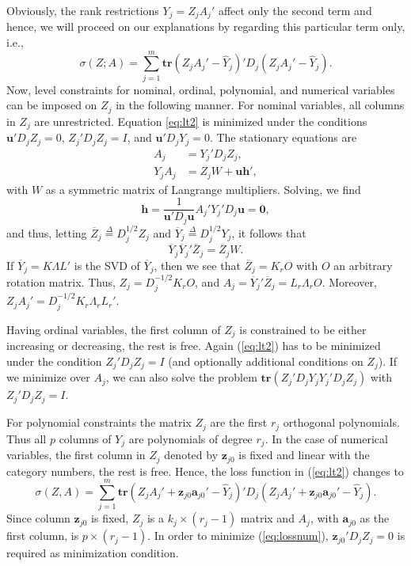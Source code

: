 \documentclass[article]{Z}
\newcommand{\defi}{\mathop{=}\limits^{\Delta}}
\begin{document}
Obviously, the rank restrictions $Y_j=Z_jA_j'$ affect only the second term and hence, we will proceed on our explanations by regarding this particular term only, i.e.,
\begin{equation}
\label{eq:lt2}
\sigma(Z;A)=\sum_{j=1}^m \mathbf{tr}(Z_jA_j'-\hat Y_j)'D_j(Z_jA_j'-\hat Y_j).
\end{equation}
Now, level constraints for nominal, ordinal, polynomial, and numerical variables can be imposed on $Z_j$ in the following manner. 
For nominal variables, all columns in $Z_j$ are unrestricted. Equation \ref{eq:lt2} is minimized under the conditions $\mathbf{u}'D_jZ_j=0$, $Z_j'D_jZ_j=I$, and $\mathbf{u}'D_jY_j=0$. The stationary equations are 
\begin{subequations}
\begin{align}
A_j&=Y_j'D_jZ_j,\\
Y_jA_j&=Z_jW+\mathbf{uh}',
\end{align}
\end{subequations}
with $W$ as a symmetric matrix of Langrange multipliers. Solving, we find
\begin{equation}
\mathbf{h}=\frac{1}{\mathbf{u}'D_j\mathbf{u}}A_j'Y_j'D_j\mathbf{u}=\mathbf{0},
\end{equation}
and thus, letting $\overline Z_j\defi D_j^{1/2}Z_j$ and $\overline Y_j\defi D_j^{1/2}Y_j$, it follows that
\begin{equation}
\overline Y_j\overline Y_j' \overline Z_j=\overline Z_jW.
\end{equation}
If $\overline Y_j=K\Lambda L'$ is the SVD of $\overline Y_j$, then
we see that $\overline Z_j=K_rO$ with $O$ an arbitrary rotation matrix. Thus, $Z_j=D_j^{-1/2}K_rO$, and
$A_j=\overline Y_j'\overline Z_j=L_r\Lambda_r O$. Moreover, $Z_jA_j'=D_j^{-1/2}K_r\Lambda_rL_r'$.

Having ordinal variables, the first column of $Z_j$ is constrained to be either increasing or decreasing, the rest is free. Again (\ref{eq:lt2}) has to be minimized under the condition $Z_j'D_j^{}Z_j^{}=I$ (and optionally additional conditions on $Z_j$). If we minimize over $A_j$, we can also solve the problem $\mathbf{tr}(Z_j'D_j^{}Y_j^{}Y_j'D_j^{}Z_j^{})$ with $Z_j'D_j^{}Z_j^{}=I$.

For polynomial constraints the matrix $Z_j$ are the first \(r_j\) orthogonal polynomials. Thus all \(p\) columns of \(Y_j\) are polynomials of degree \(r_j\).  In the case of numerical variables, the first column in $Z_j$ denoted by $\mathbf{z}_{j0}$ is fixed and linear with the category numbers, the rest is free. 
Hence, the loss function in (\ref{eq:lt2}) changes to 
\begin{equation}
\label{eq:lossnum}
\sigma(Z,A)=\sum_{j=1}^m \mathbf{tr}(Z_jA_j'+\mathbf{z}_{j0}\mathbf{a}_{j0}'- \hat Y_j)'D_j(Z_jA_j'+\mathbf{z}_{j0}\mathbf{a}_{j0}'-\hat Y_j).
\end{equation}
Since column $\mathbf{z}_{j0}$ is fixed, $Z_j$ is a $k_j \times (r_j-1)$ matrix and $A_j$, with $\mathbf{a}_{j0}$ as the first column, is $p \times (r_j-1)$. In order to minimize (\ref{eq:lossnum}), $\mathbf{z}_{j0}'D_jZ_j=0$ is required as minimization condition.
\end{document}
